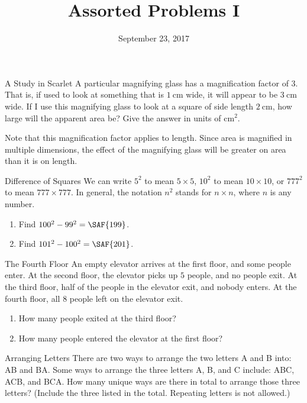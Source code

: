 \documentclass[14pt,letterpaper]{article}
\title{Assorted Problems I}
\date{September 23, 2017}
\begin{document}
\HomeworkTitle

\thispagestyle{empty}

\begin{problem}{A Study in Scarlet}
 A particular magnifying glass has a magnification factor of $3$. That is, if
 used to look at something that is $\SI{1}{\centi\metre}$ wide, it will appear
 to be $\SI{3}{\centi\metre}$ wide. If I use this magnifying glass to look at a
 square of side length $\SI{2}{\centi\metre}$, how large will the apparent area
 be? Give the answer in units of $\si{\centi\metre\squared}$.

 Note that this magnification factor applies to length. Since area is magnified
 in multiple dimensions, the effect of the magnifying glass will be greater on
 area than it is on length. 
\end{problem}

\begin{problem}{Difference of Squares}
 We can write $5^2$ to mean $5\times5$, $10^2$ to mean $10\times10$, or $777^2$
 to mean $777\times777$. In general, the notation $n^2$ stands for $n\times n$,
 where $n$ is any number.

 \begin{enumerate}[\hspace{1cm}a.]
  \item Find $100^2 - 99^2 = \SAF{199}$.
  \item Find $101^2 - 100^2 = \SAF{201}$.
 \end{enumerate}
\end{problem}

\begin{problem}{The Fourth Floor}
 An empty elevator arrives at the first floor, and some people enter. At the
 second floor, the elevator picks up $5$ people, and no people exit. At the
 third floor, half of the people in the elevator exit, and nobody enters. At the
 fourth floor, all $8$ people left on the elevator exit.

 \begin{enumerate}[\hspace{1cm}a.]
  \item How many people exited at the third floor? \hfill {}
  \item How many people entered the elevator at the first floor? \hfill {}
 \end{enumerate}
\end{problem}

\begin{problem}{Arranging Letters}
 There are two ways to arrange the two letters A and B into: AB and BA. Some
 ways to arrange the three letters A, B, and C include: ABC, ACB, and BCA. How
 many unique ways are there in total to arrange those three letters? (Include
 the three listed in the total. Repeating letters is not allowed.)
\end{problem}
\end{document}
